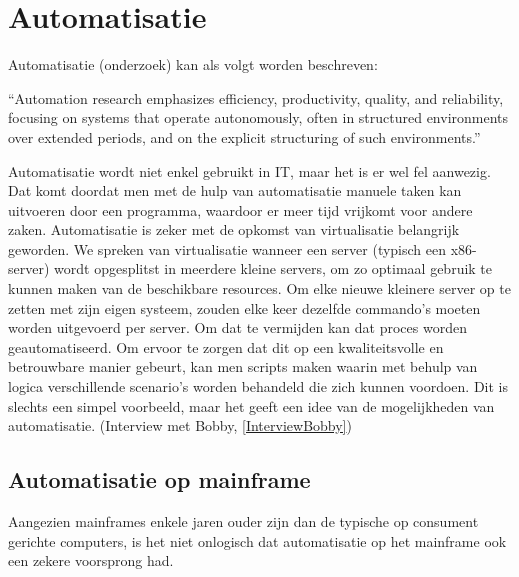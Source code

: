 \section{Automatisatie}
Automatisatie (onderzoek) kan als volgt worden beschreven:

“Automation research emphasizes efficiency, productivity, quality, and reliability, focusing on systems that operate autonomously, often in structured environments over extended periods, and on the explicit structuring of such environments.” \autocite[1]{Goldberg2012}

Automatisatie wordt niet enkel gebruikt in IT, maar het is er wel fel aanwezig. Dat komt doordat men met de hulp van automatisatie manuele taken kan uitvoeren door een programma, waardoor er meer tijd vrijkomt voor andere zaken. Automatisatie is zeker met de opkomst van virtualisatie belangrijk geworden. We spreken van virtualisatie wanneer een server (typisch een x86-server) wordt opgesplitst in meerdere kleine servers, om zo optimaal gebruik te kunnen maken van de beschikbare resources. Om elke nieuwe kleinere server op te zetten met zijn eigen systeem, zouden elke keer dezelfde commando’s moeten worden uitgevoerd per server. Om dat te vermijden kan dat proces worden geautomatiseerd. Om ervoor te zorgen dat dit op een kwaliteitsvolle en betrouwbare manier gebeurt, kan men scripts maken waarin met behulp van logica verschillende scenario's worden behandeld die zich kunnen voordoen. Dit is slechts een simpel voorbeeld, maar het geeft een idee van de mogelijkheden van automatisatie.  (Interview met Bobby, \ref{InterviewBobby})

\subsection{Automatisatie op mainframe}
Aangezien mainframes enkele jaren ouder zijn dan de typische op consument gerichte computers, is het niet onlogisch dat automatisatie op het mainframe ook een zekere voorsprong had.

